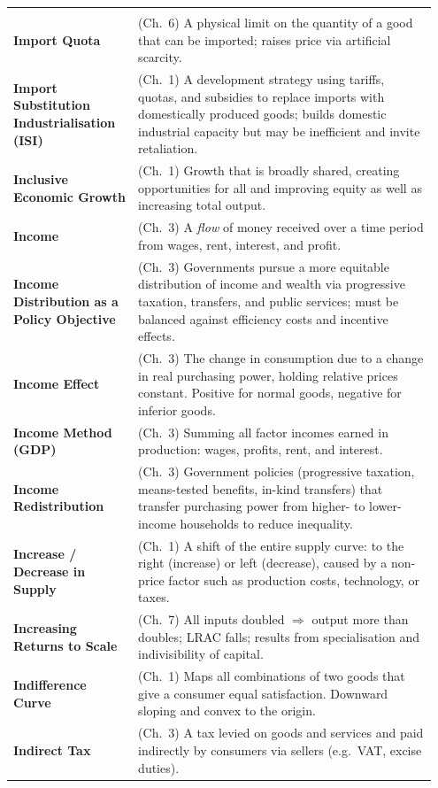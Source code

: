 \documentclass[11pt, a4paper, twoside]{book}
\begin{document}
\begin{longtable}{@{}>{\RaggedRight\arraybackslash}p{0.28\linewidth}>{\RaggedRight\arraybackslash}p{0.67\linewidth}@{}}
\multicolumn{2}{@{}l}{\textbf{\Large\color{CurveNavy} I}} \\[2pt]
\textbf{Import Quota} & (Ch.~6) A physical limit on the quantity of a good that can be imported; raises price via artificial scarcity. \\
\textbf{Import Substitution Industrialisation (ISI)} & (Ch.~1) A development strategy using tariffs, quotas, and subsidies to replace imports with domestically produced goods; builds domestic industrial capacity but may be inefficient and invite retaliation. \\
\textbf{Inclusive Economic Growth} & (Ch.~1) Growth that is broadly shared, creating opportunities for all and improving equity as well as increasing total output. \\
\textbf{Income} & (Ch.~3) A \emph{flow} of money received over a time period from wages, rent, interest, and profit. \\
\textbf{Income Distribution as a Policy Objective} & (Ch.~3) Governments pursue a more equitable distribution of income and wealth via progressive taxation, transfers, and public services; must be balanced against efficiency costs and incentive effects. \\
\textbf{Income Effect} & (Ch.~3) The change in consumption due to a change in real purchasing power, holding relative prices constant. Positive for normal goods, negative for inferior goods. \\
\textbf{Income Method (GDP)} & (Ch.~3) Summing all factor incomes earned in production: wages, profits, rent, and interest. \\
\textbf{Income Redistribution} & (Ch.~3) Government policies (progressive taxation, means-tested benefits, in-kind transfers) that transfer purchasing power from higher- to lower-income households to reduce inequality. \\
\textbf{Increase / Decrease in Supply} & (Ch.~1) A shift of the entire supply curve: to the right (increase) or left (decrease), caused by a non-price factor such as production costs, technology, or taxes. \\
\textbf{Increasing Returns to Scale} & (Ch.~7) All inputs doubled $\Rightarrow$ output more than doubles; LRAC falls; results from specialisation and indivisibility of capital. \\
\textbf{Indifference Curve} & (Ch.~1) Maps all combinations of two goods that give a consumer equal satisfaction. Downward sloping and convex to the origin. \\
\textbf{Indirect Tax} & (Ch.~3) A tax levied on goods and services and paid indirectly by consumers via sellers (e.g.\ VAT, excise duties). \\

\end{longtable}
\end{document}
